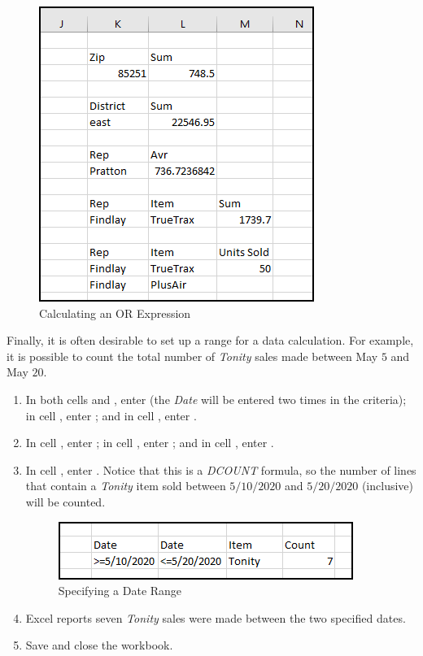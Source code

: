 \begin{enumerate}
	\begin{figure}[H]
		\centering
		\includegraphics[width=\maxwidth{.75\linewidth}]{gfx/ch09_fig23}
		\caption{Calculating an OR Expression}
		\label{09:fig23}
	\end{figure}
\end{enumerate}

Finally, it is often desirable to set up a range for a data calculation. For example, it is possible to count the total number of \textit{Tonity} sales made between May $ 5 $ and May $ 20 $.

\begin{enumerate}
	\item In both cells  and , enter  (the \textit{Date} will be entered two times in the criteria); in cell , enter ; and in cell , enter .
	\item In cell , enter ; in cell , enter ; and in cell , enter .
	\item In cell , enter  . Notice that this is a \textit{DCOUNT} formula, so the number of lines that contain a \textit{Tonity} item sold between $ 5/10/2020 $ and $ 5/20/2020 $ (inclusive) will be counted.
	
	\begin{figure}[H]
		\centering
		\includegraphics[width=\maxwidth{.95\linewidth}]{gfx/ch09_fig24}
		\caption{Specifying a Date Range}
		\label{09:fig24}
	\end{figure}

	\item Excel reports seven \textit{Tonity} sales were made between the two specified dates.
	\item Save and close the  workbook.

\end{enumerate}

